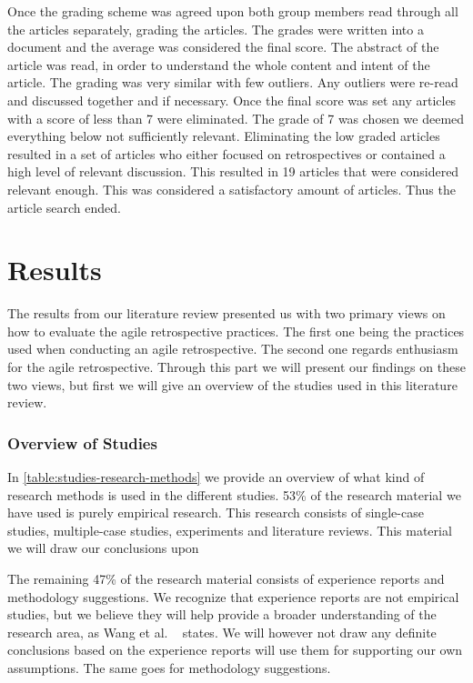 \documentclass[12pt]{article}
\begin{document}
Once the grading scheme was agreed upon both group members read through all the articles separately, grading the articles. The grades were written into a document and the average was considered the final score. The abstract of the article was read, in order to understand the whole content and intent of the article. The grading was very similar with few outliers. Any outliers were re-read and discussed together and if necessary. Once the final score was set any articles with a score of less than 7 were eliminated. The grade of 7 was chosen we deemed everything below not sufficiently relevant. Eliminating the low graded articles resulted in a set of articles who either focused on retrospectives or contained a high level of relevant discussion. This resulted in 19 articles that were considered relevant enough. This was considered a satisfactory amount of articles. Thus the article search ended.


\clearpage

\part{Results}
The results from our literature review presented us with two primary views on how to evaluate the agile retrospective practices. The first one being the practices used when conducting an agile retrospective. The second one regards enthusiasm for the agile retrospective. Through this part we will present our findings on these two views, but first we will give an overview of the studies used in this literature review. 

\section{Overview of Studies}
In \autoref{table:studies-research-methods} we provide an overview of what kind of research methods is used in the different studies. 53\% of the research material we have used is purely empirical research. This research consists of single-case studies, multiple-case studies, experiments and literature reviews. This material we will draw our conclusions upon 

The remaining 47\% of the research material consists of experience reports and methodology suggestions. We recognize that experience reports are not empirical studies, but we believe they will help provide a broader understanding of the research area, as Wang et al. ~\cite{Wang2012} states. We will however not draw any definite conclusions based on the experience reports will use them for supporting our own assumptions. The same goes for methodology suggestions. 
\end{document}
